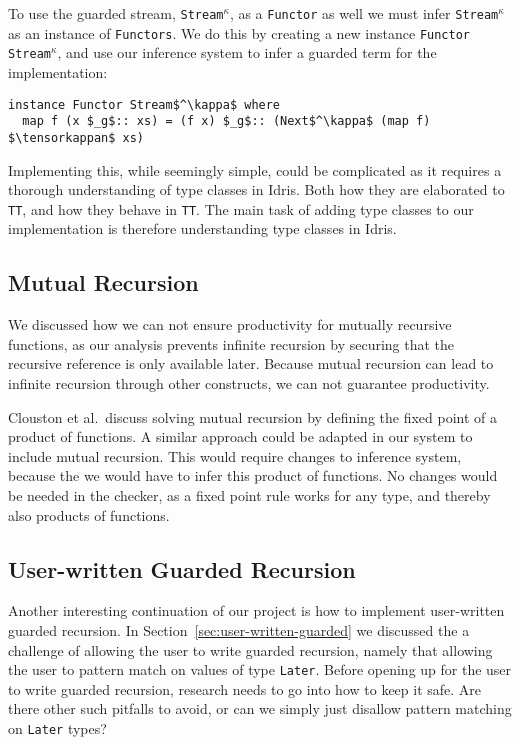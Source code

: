 To use the guarded stream, \texttt{Stream}$^\kappa$, as a \texttt{Functor} as well we
must infer \texttt{Stream}$^\kappa$ as an instance of \texttt{Functors}. We do
this by creating a new instance \texttt{Functor Stream}$^\kappa$, and use our
inference system to infer a guarded term for the implementation:

\begin{lstlisting}[mathescape, title=\idrisBlock]
instance Functor Stream$^\kappa$ where
  map f (x $_g$:: xs) = (f x) $_g$:: (Next$^\kappa$ (map f) $\tensorkappan$ xs)
\end{lstlisting}

Implementing this, while seemingly simple, could be complicated as it requires a
thorough understanding of type classes in Idris. Both how they are elaborated to
\texttt{TT}, and how they behave in \texttt{TT}. The main task of adding type
classes to our implementation is therefore understanding type classes in Idris.

\subsection{Mutual Recursion}
We discussed how we can not ensure productivity for mutually recursive
functions, as our analysis prevents infinite recursion by securing that the
recursive reference is only available later. Because mutual recursion can lead
to infinite recursion through other constructs, we can not guarantee productivity.

Clouston et al.\,\citep{BirkedalL:guarded-lambda-conf} discuss solving mutual
recursion by defining the fixed point of a product of functions. A similar
approach could be adapted in our system to include mutual recursion. This would
require changes to inference system, because the we would have to infer this
product of functions. No changes would be needed in the checker, as a fixed
point rule works for any type, and thereby also products of functions. 

\subsection{User-written Guarded Recursion}
Another interesting continuation of our project is how to implement user-written
guarded recursion. In Section~\ref{sec:user-written-guarded} we discussed the
a challenge of allowing the user to write guarded recursion, namely that
allowing the user to pattern match on values of type \texttt{Later}. Before
opening up for the user to write guarded recursion, research needs to go into
how to keep it safe. Are there other such pitfalls to avoid, or can we simply
just disallow pattern matching on \texttt{Later} types?

